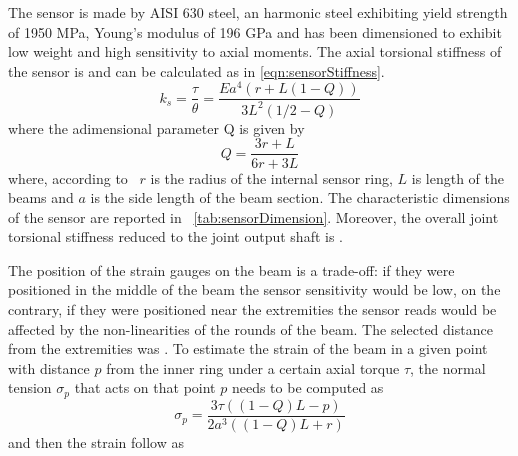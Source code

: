 %
The sensor is made by AISI 630 steel, an harmonic steel exhibiting yield strength of 1950 MPa, Young's modulus of 196 GPa and has been dimensioned to exhibit low weight and high sensitivity to axial moments.
The axial torsional stiffness of the sensor is \DIFdelbegin {}\DIFdelend \DIFaddbegin {}\DIFaddend and can be calculated as in \eqref{eqn:sensorStiffness}.
\begin{equation}
\label{eqn:sensorStiffness}
k_{s} = \frac{\tau}{\theta} = \frac{Ea^4(r+L(1-Q))}{3L^2(1/2-Q)}	
\end{equation}
where the adimensional parameter Q is given by
\begin{equation}
\label{eqn:adimensionalQ}
Q = \frac{3r+L}{6r+3L}	
\end{equation}
where, according to \figurename \ \DIFdelbegin {}\DIFdelend \DIFaddbegin {}\DIFaddend $r$ is the radius of the internal sensor ring, $L$ is length of the beams and $a$ is the side length of the beam section.
The characteristic dimensions of the sensor are reported in \tablename \ \ref{tab:sensorDimension}.
Moreover, the overall joint torsional stiffness reduced to the joint output shaft is \DIFdelbegin {}\DIFdelend \DIFaddbegin {}\DIFaddend .
\par The position of the strain gauges on the beam is a trade-off: if they were positioned in the middle of the beam the sensor sensitivity would be low, on the contrary, if they were positioned near the extremities the sensor reads would be affected by the non-linearities of the rounds of the beam. The selected distance from the extremities was \DIFdelbegin {}\DIFdelend \DIFaddbegin {}\DIFaddend .
To estimate the strain of the beam in a given point with distance $p$ from the inner ring under a certain axial torque $\tau$, the normal tension $\sigma_p$ that acts on that point $p$ needs to be computed as
\begin{equation}
\label{eqn:normalTensionOnBeam}
\sigma_p = \frac{3\tau((1-Q)L-p)}{2a^3((1-Q)L+r)}	
\end{equation}
and then the strain follow as 
